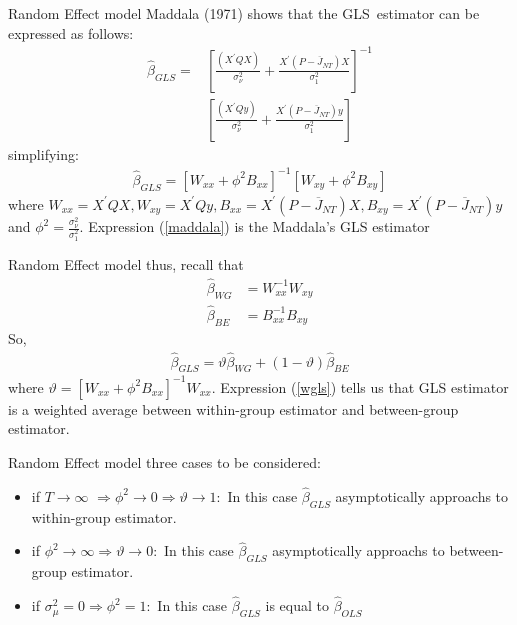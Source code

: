\begin{frame}{Random Effect model}
	Maddala (1971) shows that the GLS\ estimator can be expressed as follows:%
		\begin{align*}
			\widehat{\beta }_{GLS} = & \left[ \frac{\left( X^{\prime }QX\right) }{\sigma
									   _{\nu }^{2}}+\frac{X^{\prime }\left( P-\overline{J}_{NT}\right) X}{\sigma
									   _{1}^{2}}\right] ^{-1} \\
									 & \left[ \frac{\left( X^{\prime }Qy\right) }{\sigma _{\nu }^{2}}+\frac{
									 	X^{\prime }\left( P-\overline{J}_{NT}\right) y}{\sigma _{1}^{2}}\right]
		\end{align*}
	simplifying:
		\begin{gather}
			\widehat{\beta }_{GLS}=\left[ W_{xx}+\phi ^{2}B_{xx}\right] ^{-1}\left[W_{xy}+\phi ^{2}B_{xy}\right]  \label{maddala}
		\end{gather}
	where $W_{xx}=X^{\prime }QX,W_{xy}=X^{\prime }Qy,B_{xx}=X^{\prime }\left( P-\overline{J}_{NT}\right) X,B_{xy}=X^{\prime }\left( P-\overline{J}_{NT}\right) y$ and $\phi ^{2}=\frac{\sigma _{\nu }^{2}}{\sigma _{1}^{2}}.$ Expression (\ref{maddala}) is the Maddala's GLS estimator
\end{frame}
\begin{frame}{Random Effect model}
	thus, recall that 
		\begin{align*}
			\widehat{\beta }_{WG} & = W_{xx}^{-1}W_{xy} \\
			\widehat{\beta }_{BE} & = B_{xx}^{-1}B_{xy}
		\end{align*}
	So,
		\begin{gather}
			\widehat{\beta }_{GLS}=\vartheta \widehat{\beta }_{WG}+\left( 1-\vartheta \right) \widehat{\beta }_{BE}  \label{wgls}
		\end{gather}
	where $\vartheta =\left[ W_{xx}+\phi ^{2}B_{xx}\right] ^{-1}W_{xx}.$ Expression (\ref{wgls}) tells us that GLS estimator is a weighted average between within-group estimator and between-group estimator.
\end{frame}
\begin{frame}{Random Effect model}
	three cases to be considered:
		\begin{itemize}
			\item if $T\rightarrow \infty $ $\Rightarrow \phi^{2}\rightarrow 0\Rightarrow \vartheta \rightarrow 1:$ In this case $\widehat{\beta}_{GLS}$ asymptotically approachs to within-group estimator. \pause
			\item if $\phi^{2}\rightarrow \infty \Rightarrow \vartheta \rightarrow 0:$ In this case $\widehat{\beta}_{GLS}$ asymptotically approachs to between-group estimator. \pause
			\item if $\sigma_{\mu}^{2}=0\Rightarrow \phi^{2}=1:$ In this case $\widehat{\beta}_{GLS}$ is equal to $\widehat{\beta}_{OLS}$
		\end{itemize}
\end{frame}

